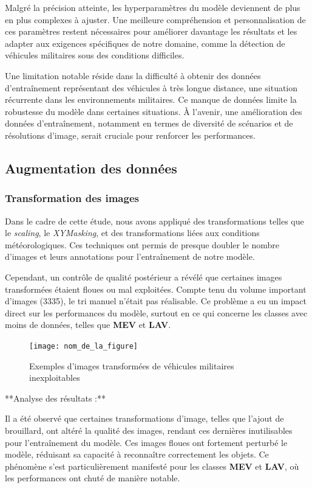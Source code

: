 Malgré la précision atteinte, les hyperparamètres du modèle deviennent de plus en plus complexes à ajuster. Une meilleure compréhension et personnalisation de ces paramètres restent nécessaires pour améliorer davantage les résultats et les adapter aux exigences spécifiques de notre domaine, comme la détection de véhicules militaires sous des conditions difficiles.

Une limitation notable réside dans la difficulté à obtenir des données d'entraînement représentant des véhicules à très longue distance, une situation récurrente dans les environnements militaires. Ce manque de données limite la robustesse du modèle dans certaines situations. À l'avenir, une amélioration des données d'entraînement, notamment en termes de diversité de scénarios et de résolutions d'image, serait cruciale pour renforcer les performances.

\subsection{Augmentation des données}

\subsubsection{Transformation des images}
Dans le cadre de cette étude, nous avons appliqué des transformations telles que le \textit{scaling}, le \textit{XYMasking}, et des transformations liées aux conditions météorologiques. 
Ces techniques ont permis de presque doubler le nombre d'images et leurs annotations pour l'entraînement de notre modèle.

Cependant, un contrôle de qualité postérieur a révélé que certaines images transformées étaient floues ou mal exploitées. Compte tenu du volume important d'images (3335), le tri manuel n'était pas réalisable. Ce problème a eu un impact direct sur les performances du modèle, surtout en ce qui concerne les classes avec moins de données, telles que \textbf{MEV} et \textbf{LAV}.

\begin{figure}[H]
    \centering
    \texttt{[image: nom\_de\_la\_figure]}
    \caption{Exemples d'images transformées de véhicules militaires inexploitables}
    \label{fig:image_floues}
\end{figure}

**Analyse des résultats :** 

Il a été observé que certaines transformations d'image, telles que l'ajout de brouillard, ont altéré la qualité des images, rendant ces dernières inutilisables pour l'entraînement du modèle.
Ces images floues ont fortement perturbé le modèle, réduisant sa capacité à reconnaître correctement les objets.
Ce phénomène s'est particulièrement manifesté pour les classes \textbf{MEV} et \textbf{LAV}, où les performances ont chuté de manière notable.

